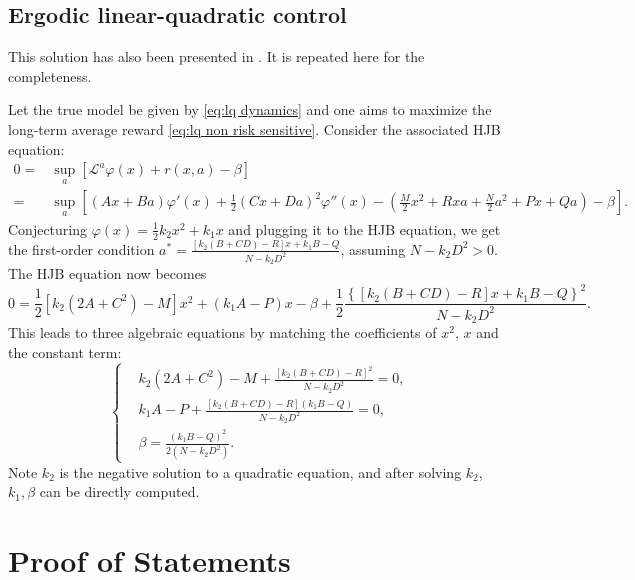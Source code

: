 \subsection{Ergodic linear-quadratic control}
\label{sec:lq true solution}
This solution has also been presented in \citet[Appendix B2]{jia2022policypg}. It is repeated here for the completeness.

Let the true model be given by \eqref{eq:lq dynamics} and one aims to maximize the long-term average reward \eqref{eq:lq non risk sensitive}.
Consider the associated HJB equation:
\[\begin{aligned}
0 = & \sup_{a}[ \mathcal{L}^a \varphi(x) + r(x,a) -\beta] \\
=&  \sup_{a}\left[(Ax + Ba)\varphi'(x) + \frac{1}{2}(Cx + Da)^2\varphi''(x) - (\frac{M}{2}x^2 + Rxa + \frac{N}{2}a^2 + Px + Qa)  -\beta \right] . 	
\end{aligned} \]
Conjecturing  $\varphi(x) = \frac{1}{2}k_2 x^2 + k_1 x$ and plugging it to the HJB equation, we get the first-order condition $a^* = \frac{[k_2(B+CD)-R]x + k_1B - Q}{N -k_2 D^2}$, assuming $N - k_2D^2 > 0$. The HJB equation now becomes
\[ 0 = \frac{1}{2}[k_2(2A+C^2) - M]x^2 + (k_1A - P)x - \beta + \frac{1}{2} \frac{\left\{ [k_2(B+CD)-R]x + k_1B - Q \right\}^2}{N - k_2D^2} .\]
This leads to three algebraic equations by matching the coefficients of $x^2$, $x$ and the constant term:
\begin{equation*}
\label{eq:lq algebraic equations}
\left\{ \begin{aligned}
& k_2(2A+C^2) - M + \frac{[k_2(B+CD)-R]^2}{N-k_2 D^2}  = 0,\\
& k_1A - P + \frac{[k_2(B+CD)-R](k_1B - Q)}{N-k_2D^2} = 0,\\
& \beta = \frac{(k_1 B-Q)^2}{2(N - k_2D^2)}.
\end{aligned} \right.  
\end{equation*}
Note $k_2$ is the negative solution to a quadratic equation, and after solving $k_2$, $k_1,\beta$ can be directly computed. 
\section{Proof of Statements}\label{appendix:proof}

